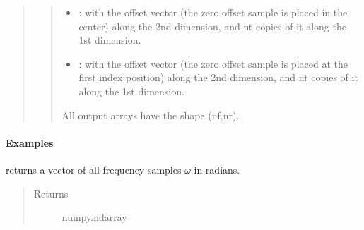 \documentclass[letterpaper,10pt,english]{sphinxmanual}
\begin{document}
\begin{fulllineitems}
\begin{fulllineitems}
\begin{quote}
\begin{description}
\begin{quote}
\begin{description}
\begin{itemize}
\item {} 
: with the offset vector  (the zero offset sample is placed in the center) along the 2nd dimension, and nt copies of it along the 1st dimension.

\item {} 
: with the offset vector  (the zero offset sample is placed at the first index position) along the 2nd dimension, and nt copies of it along the 1st dimension.

\end{itemize}

\end{description}

All output arrays have the shape (nf,nr).
\end{quote}

\end{description}\end{quote}
\paragraph{Examples}

%
\begin{sphinxVerbatim}[commandchars=\\\{\}]
     
\PYG{p}{[}\PYG{p}{]}\PYG{p}{[}\PYG{p}{]}
\end{sphinxVerbatim}

\end{fulllineitems}


\begin{fulllineitems}
\label{\detokenize{Wavefield_NRM_p_w:Wavefield_NRM_p_w.Wavefield_NRM_p_w.Wvec}}
returns a vector of all frequency samples \(\omega\) in radians.
\begin{quote}\begin{description}
\item[{Returns}] \leavevmode
numpy.ndarray
\begin{quote}


\end{quote}
\end{description}
\end{quote}
\end{fulllineitems}
\end{fulllineitems}
\end{document}
